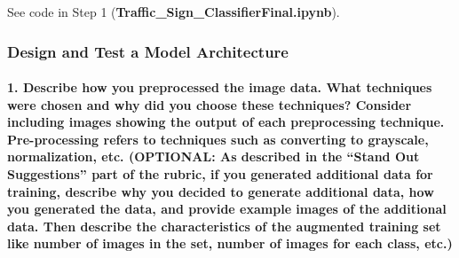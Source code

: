\documentclass[11pt]{article}
\begin{document}
See code in Step 1 (\textbf{Traffic\_Sign\_ClassifierFinal.ipynb}).

\hypertarget{design-and-test-a-model-architecture}{%
\subsubsection{Design and Test a Model
Architecture}\label{design-and-test-a-model-architecture}}

\hypertarget{describe-how-you-preprocessed-the-image-data.-what-techniques-were-chosen-and-why-did-you-choose-these-techniques-consider-including-images-showing-the-output-of-each-preprocessing-technique.-pre-processing-refers-to-techniques-such-as-converting-to-grayscale-normalization-etc.-optional-as-described-in-the-stand-out-suggestions-part-of-the-rubric-if-you-generated-additional-data-for-training-describe-why-you-decided-to-generate-additional-data-how-you-generated-the-data-and-provide-example-images-of-the-additional-data.-then-describe-the-characteristics-of-the-augmented-training-set-like-number-of-images-in-the-set-number-of-images-for-each-class-etc.}{%
\paragraph{1. Describe how you preprocessed the image data. What
techniques were chosen and why did you choose these techniques? Consider
including images showing the output of each preprocessing technique.
Pre-processing refers to techniques such as converting to grayscale,
normalization, etc. (OPTIONAL: As described in the ``Stand Out
Suggestions'' part of the rubric, if you generated additional data for
training, describe why you decided to generate additional data, how you
generated the data, and provide example images of the additional data.
Then describe the characteristics of the augmented training set like
number of images in the set, number of images for each class,
etc.)}\label{describe-how-you-preprocessed-the-image-data.-what-techniques-were-chosen-and-why-did-you-choose-these-techniques-consider-including-images-showing-the-output-of-each-preprocessing-technique.-pre-processing-refers-to-techniques-such-as-converting-to-grayscale-normalization-etc.-optional-as-described-in-the-stand-out-suggestions-part-of-the-rubric-if-you-generated-additional-data-for-training-describe-why-you-decided-to-generate-additional-data-how-you-generated-the-data-and-provide-example-images-of-the-additional-data.-then-describe-the-characteristics-of-the-augmented-training-set-like-number-of-images-in-the-set-number-of-images-for-each-class-etc.}}
\end{document}
